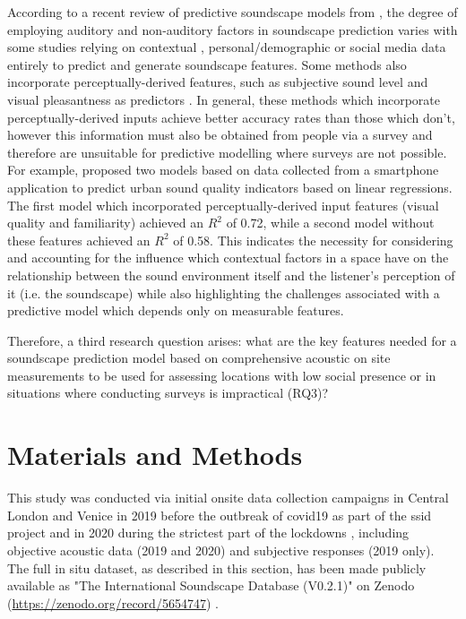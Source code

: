  According to a recent review of predictive soundscape models from \citet{Lionello2020systematic}, the degree of employing auditory and non-auditory factors in soundscape prediction varies with some studies relying on contextual \citep{Kajihara2017Imaginary}, personal/demographic \citep{Erfanian2021Psychological,Tarlao2020Investigating} or social media \citep{Aiello2016Chatty} data entirely to predict and generate soundscape features. Some methods also incorporate perceptually-derived features, such as subjective sound level and visual pleasantness as predictors \citep{Lionello2020systematic}. In general, these methods which incorporate perceptually-derived inputs achieve better accuracy rates than those which don't, however this information must also be obtained from people via a survey and therefore are unsuitable for predictive modelling where surveys are not possible. For example, \citet{Ricciardi2015Sound} proposed two models based on data collected from a smartphone application to predict urban sound quality indicators based on linear regressions. The first model which incorporated perceptually-derived input features (visual quality and familiarity) achieved an $R^2$ of 0.72, while a second model without these features achieved an $R^2$ of 0.58. This indicates the necessity for considering and accounting for the influence which contextual factors in a space have on the relationship between the sound environment itself and the listener's perception of it (i.e. the soundscape) while also highlighting the challenges associated with a predictive model which depends only on measurable features.

 Therefore, a third research question arises: what are the key features needed for a soundscape prediction model based on comprehensive acoustic on site measurements to be used for assessing locations with low social presence or in situations where conducting surveys is impractical (RQ3)?

\section{Materials and Methods}

 This study was conducted via initial onsite data collection campaigns in Central London and Venice in 2019 before the outbreak of \gls{covid19} as part of the \gls{ssid} project \citep{Mitchell2020Soundscape} and in 2020 during the strictest part of the lockdowns \citep{Aletta2020Assessing}, including objective acoustic data (2019 and 2020) and subjective responses (2019 only). The full in situ dataset, as described in this section, has been made publicly available as "The International Soundscape Database (V0.2.1)" on Zenodo (\url{https://zenodo.org/record/5654747}) \citep{Mitchell2021International}.
 
